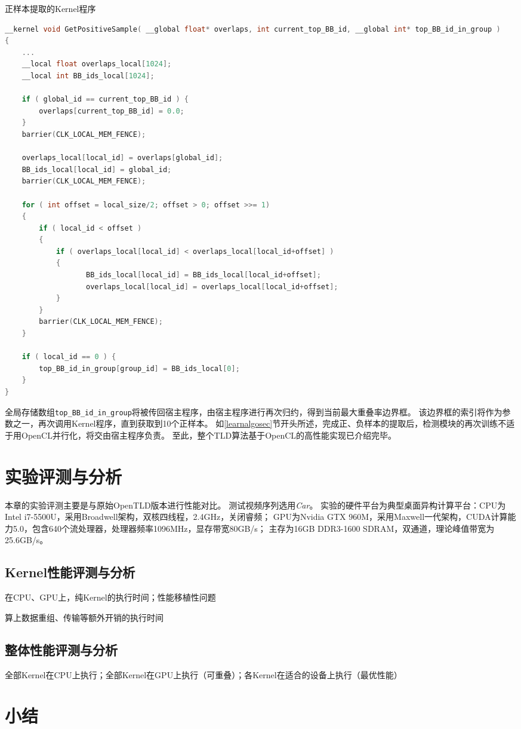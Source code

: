 \begin{table}
\caption{正样本提取的Kernel程序}
\label{positivesamplecode}
\begin{lstlisting}[language=C++, basicstyle=\ttfamily\footnotesize]    
__kernel void GetPositiveSample( __global float* overlaps, int current_top_BB_id, __global int* top_BB_id_in_group )
{			
    ...
    __local float overlaps_local[1024];
    __local int BB_ids_local[1024];

    if ( global_id == current_top_BB_id ) {
        overlaps[current_top_BB_id] = 0.0;
    }
    barrier(CLK_LOCAL_MEM_FENCE);

    overlaps_local[local_id] = overlaps[global_id];
    BB_ids_local[local_id] = global_id;
    barrier(CLK_LOCAL_MEM_FENCE);

    for ( int offset = local_size/2; offset > 0; offset >>= 1) 
    {
        if ( local_id < offset ) 
        {
            if ( overlaps_local[local_id] < overlaps_local[local_id+offset] )
            {
                   BB_ids_local[local_id] = BB_ids_local[local_id+offset];
                   overlaps_local[local_id] = overlaps_local[local_id+offset];
            }
        }
        barrier(CLK_LOCAL_MEM_FENCE);
    }

    if ( local_id == 0 ) {
        top_BB_id_in_group[group_id] = BB_ids_local[0];
    }
}
\end{lstlisting}
\end{table}

全局存储数组\texttt{top\_BB\_id\_in\_group}将被传回宿主程序，由宿主程序进行再次归约，得到当前最大重叠率边界框。
该边界框的索引将作为参数之一，再次调用Kernel程序，直到获取到10个正样本。
如\ref{learnalgosec}节开头所述，完成正、负样本的提取后，检测模块的再次训练不适于用OpenCL并行化，将交由宿主程序负责。
至此，整个TLD算法基于OpenCL的高性能实现已介绍完毕。

\section{实验评测与分析}
本章的实验评测主要是与原始OpenTLD版本进行性能对比。
测试视频序列选用\textit{Car}。
实验的硬件平台为典型桌面异构计算平台：CPU为Intel i7-5500U，采用Broadwell架构，双核四线程，2.4GHz，关闭睿频；
GPU为Nvidia GTX 960M，采用Maxwell一代架构，CUDA计算能力5.0，包含640个流处理器，处理器频率1096MHz，显存带宽80GB/s；
主存为16GB DDR3-1600 SDRAM，双通道，理论峰值带宽为25.6GB/s。



\subsection{Kernel性能评测与分析}
在CPU、GPU上，纯Kernel的执行时间；性能移植性问题

算上数据重组、传输等额外开销的执行时间

\subsection{整体性能评测与分析}
全部Kernel在CPU上执行；全部Kernel在GPU上执行（可重叠）；各Kernel在适合的设备上执行（最优性能）

\section{小结}